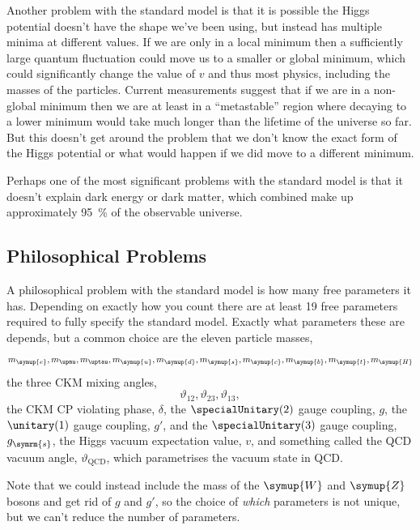 \documentclass[fleqn]{NotesClass}
\newcommand{\Pparticle}[1]{\symup{#1}}
\newcommand{\Pu}{\ensuremath{\Pparticle{u}}}
\newcommand{\Pd}{\ensuremath{\Pparticle{d}}}
\newcommand{\Ps}{\ensuremath{\Pparticle{s}}}
\newcommand{\Pc}{\ensuremath{\Pparticle{c}}}
\newcommand{\Pt}{\ensuremath{\Pparticle{t}}}
\newcommand{\Pb}{\ensuremath{\Pparticle{b}}}
\newcommand{\Penominus}{\ensuremath{\Pparticle{e}}}
\newcommand{\PZ}{\ensuremath{\Pparticle{Z}}}
\newcommand{\PW}{\ensuremath{\Pparticle{W}}}
\newcommand{\Phiggs}{\ensuremath{\Pparticle{H}}}
\newcommand{\strongCoupling}{g_{\symrm{s}}}
\begin{document}
    Another problem with the standard model is that it is possible the Higgs potential doesn't have the shape we've been using, but instead has multiple minima at different values.
    If we are only in a local minimum then a sufficiently large quantum fluctuation could move us to a smaller or global minimum, which could significantly change the value of \(v\) and thus most physics, including the masses of the particles.
    Current measurements suggest that if we are in a non-global minimum then we are at least in a \enquote{metastable} region where decaying to a lower minimum would take much longer than the lifetime of the universe so far.
    But this doesn't get around the problem that we don't know the exact form of the Higgs potential or what would happen if we did move to a different minimum.
    
    Perhaps one of the most significant problems with the standard model is that it doesn't explain dark energy or dark matter, which combined make up approximately \qty{95}{\percent} of the observable universe.
    
    \subsection{Philosophical Problems}
    A philosophical problem with the standard model is how many free parameters it has.
    Depending on exactly how you count there are at least 19 free parameters required to fully specify the standard model.
    Exactly what parameters these are depends, but a common choice are the eleven particle masses,
    \begin{equation}
        m_{\Penominus}, m_{\upmu}, m_{\uptau}, m_{\Pu}, m_{\Pd}, m_{\Ps}, m_{\Pc}, m_{\Pb}, m_{\Pt}, m_{\Phiggs}
    \end{equation}
    the three CKM mixing angles,
    \begin{equation}
        \vartheta_{12}, \vartheta_{23}, \vartheta_{13},
    \end{equation}
    the CKM CP violating phase, \(\delta\), the \(\specialUnitary(2)\) gauge coupling, \(g\), the \(\unitary(1)\) gauge coupling, \(g'\), and the \(\specialUnitary(3)\) gauge coupling, \(\strongCoupling\), the Higgs vacuum expectation value, \(v\), and something called the QCD vacuum angle, \(\vartheta_{\text{QCD}}\), which parametrises the vacuum state in QCD.
    
    Note that we could instead include the mass of the \PW{} and \PZ{} bosons and get rid of \(g\) and \(g'\), so the choice of \emph{which} parameters is not unique, but we can't reduce the number of parameters.
    
\end{document}
